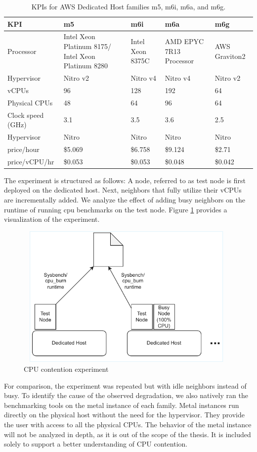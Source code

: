 \renewcommand{\arraystretch}{1.5} %
\begin{table}[h]
\centering
\begin{tabular}{|l|p{2cm}|p{2cm}|p{2cm}|p{2cm}|}
\hline
KPI & m5 & m6i & m6a & m6g \\
\hline
Processor \cite{cloudspecs} & Intel Xeon Platinum 8175/ Intel Xeon Platinum 8280	 & Intel Xeon 8375C & AMD EPYC 7R13 Processor & AWS Graviton2 \\
\hline
Hypervisor \cite{awsEC2GP2025} & Nitro v2 & Nitro v4 & Nitro v4 & Nitro v2 \\
\hline
vCPUs \cite{pricing} & 96 & 128 & 192 & 64 \\
\hline
Physical CPUs \cite{pricing} & 48 & 64 & 96 & 64 \\
\hline
Clock speed (GHz) \cite{vantage} & 3.1 & 3.5 & 3.6 & 2.5\\
\hline
Hypervisor \cite{hypervisorSpec} & Nitro & Nitro & Nitro & Nitro \\
\hline
price/hour \cite{pricing} & \$5.069 & \$6.758 & \$9.124 & \$2.71 \\
\hline
price/vCPU/hr & \$0.053 & \$0.053 & \$0.048 & \$0.042 \\
\hline
\end{tabular}
\caption{KPIs for AWS Dedicated Host families m5, m6i, m6a, and m6g.}
\label{tab:dedicated-hosts}
\end{table}
\noindent
The experiment is structured as follows: A node, referred to as test node 
is first deployed on the dedicated host. Next, neighbors that fully utilize their vCPUs are 
incrementally added. We analyze the effect of adding busy neighbors on the runtime of running 
cpu benchmarks on the test node.
Figure \ref{fig:cpu_exp} provides a visualization of the experiment. 
\begin{figure}[H]
  \centering
  \includegraphics[width=11cm, height=7cm]{figures/cpu_exp}
  \caption{CPU contention experiment}
  \label{fig:cpu_exp}
\end{figure}
\noindent
For comparison, the experiment was repeated but with idle neighbors instead of busy. To identify the cause of the 
observed degradation, we also natively ran the benchmarking tools on the metal 
instance of each family. Metal instances run directly on the physical host without the need 
for the hypervisor. They provide the user with access to all the physical 
CPUs. The behavior of the metal instance will not be analyzed in depth, 
as it is out of the scope of the thesis. It is included solely to support a better understanding of 
CPU contention.

